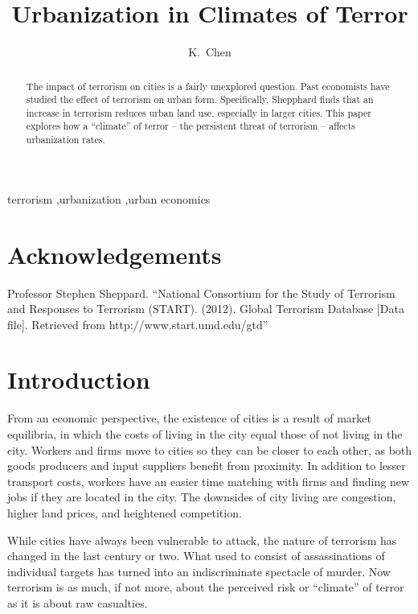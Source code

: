 \documentclass[preprint,2p,12pt]{elsarticle}
\begin{document}
\begin{frontmatter}
\title{Urbanization in Climates of Terror}
\author[kevin]{K.~Chen}
\address[kevin]{Williams College}

\begin{abstract}
The impact of terrorism on cities is a fairly unexplored question.
Past economists have studied the effect of terrorism on urban form.
Specifically, Shepphard finds that an increase in terrorism reduces urban land use, especially in larger cities.
This paper explores how a ``climate'' of terror -- the  persistent threat of terrorism -- affects urbanization rates.
\end{abstract}

\begin{keyword}
terrorism \sep urbanization \sep urban economics
\end{keyword}

\end{frontmatter}

\doublespacing

\section*{\sc Acknowledgements}
Professor Stephen Sheppard. ``National Consortium for the Study of Terrorism and Responses to Terrorism (START). (2012). Global Terrorism Database [Data file]. Retrieved from http://www.start.umd.edu/gtd''

\section{\sc Introduction}
From an economic perspective, the existence of cities is a result of market equilibria, in which the costs of living in the city equal those of not living in the city.
Workers and firms move to cities so they can be closer to each other, as both goods producers and input suppliers benefit from proximity.
In addition to lesser transport costs, workers have an easier time matching with firms and finding new jobs if they are located in the city.
The downsides of city living are congestion, higher land prices, and heightened competition.

While cities have always been vulnerable to attack, the nature of terrorism has changed in the last century or two.
What used to consist of assassinations of individual targets has turned into an indiscriminate spectacle of murder.
Now terrorism is as much, if not more, about the perceived risk or ``climate'' of terror as it is about raw casualties.
\end{document}
